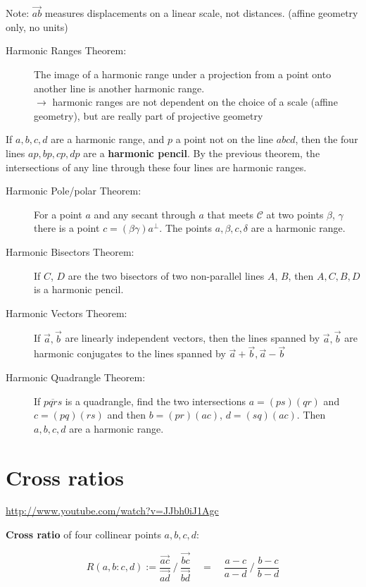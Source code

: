 \documentclass[DIV16,halfparskip]{scrartcl}
\newcommand{\nullcm}{\mathcal C}
\newcommand{\nullconic}{$\nullcm$ }
\begin{document}
Note: $\vec{ab}$ measures displacements on a linear scale, not distances.
(affine geometry only, no units)

\begin{description}
    \item[Harmonic Ranges Theorem:] The image of a harmonic range under a
    projection from a point onto another line is another harmonic range.\\
    $\to$ harmonic ranges are not dependent on the choice of a scale (affine
    geometry), but are really part of projective geometry
\end{description}

If $a, b, c, d$ are a harmonic range, and $p$ a point not on the line $abcd$,
then the four lines $ap, bp, cp, dp$ are a \textbf{harmonic pencil}. By the
previous theorem, the intersections of any line through these four lines are
harmonic ranges.

\begin{description}
    \item [Harmonic Pole/polar Theorem:] For a point $a$ and any secant
        through $a$ that meets \nullconic at two points $\beta$, $\gamma$ there
        is a point $c = (\beta\gamma)a^\perp$. The points $a, \beta, c, \delta$ are
        a harmonic range.
    \item [Harmonic Bisectors Theorem:] If $C$, $D$ are the two bisectors of
        two non-parallel lines $A$, $B$, then $A, C, B, D$ is a harmonic pencil.
    \item [Harmonic Vectors Theorem:] If $\vec{a}, \vec{b}$ are linearly
        independent vectors, then the lines spanned by $\vec{a}, \vec{b}$ are
        harmonic conjugates to the lines spanned by $\vec{a}+\vec{b}, \vec{a}-\vec{b}$
    \item [Harmonic Quadrangle Theorem:] If $\overline{pqrs}$ is a quadrangle,
        find the two intersections $a = (ps)(qr)$ and $c = (pq)(rs)$ and then
        $b = (pr)(ac)$, $d = (sq)(ac)$. Then $a, b, c, d$ are a harmonic range.
\end{description}

\section{Cross ratios}
\url{http://www.youtube.com/watch?v=JJbh0iJ1Agc}

\textbf{Cross ratio} of four collinear points $a, b, c, d$:

\[ R(a,b:c,d) := \frac{\vec{ac}}{\vec{ad}} ~ / ~ \frac{\vec{bc}}{\vec{bd}}
    \quad = \quad \frac{a-c}{a-d} ~ / ~ \frac{b-c}{b-d}\]
\end{document}
